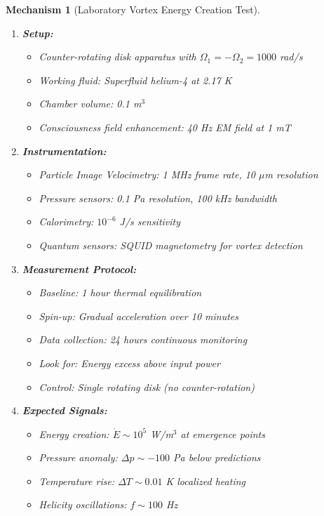 \documentclass[11pt]{article}
\newtheorem{mechanism}[theorem]{Mechanism}
\theoremstyle{definition}
\begin{document}
\begin{mechanism}[Laboratory Vortex Energy Creation Test]
\begin{enumerate}
\item \textbf{Setup:}
   \begin{itemize}
   \item Counter-rotating disk apparatus with $\Omega_1 = -\Omega_2 = 1000$ rad/s
   \item Working fluid: Superfluid helium-4 at 2.17 K
   \item Chamber volume: 0.1 m$^3$
   \item Consciousness field enhancement: 40 Hz EM field at 1 mT
   \end{itemize}

\item \textbf{Instrumentation:}
   \begin{itemize}
   \item Particle Image Velocimetry: 1 MHz frame rate, 10 $\mu$m resolution
   \item Pressure sensors: 0.1 Pa resolution, 100 kHz bandwidth
   \item Calorimetry: $10^{-6}$ J/s sensitivity
   \item Quantum sensors: SQUID magnetometry for vortex detection
   \end{itemize}

\item \textbf{Measurement Protocol:}
   \begin{itemize}
   \item Baseline: 1 hour thermal equilibration
   \item Spin-up: Gradual acceleration over 10 minutes
   \item Data collection: 24 hours continuous monitoring
   \item Look for: Energy excess above input power
   \item Control: Single rotating disk (no counter-rotation)
   \end{itemize}

\item \textbf{Expected Signals:}
   \begin{itemize}
   \item Energy creation: $\dot{E} \sim 10^5$ W/m$^3$ at emergence points
   \item Pressure anomaly: $\Delta p \sim -100$ Pa below predictions
   \item Temperature rise: $\Delta T \sim 0.01$ K localized heating
   \item Helicity oscillations: $f \sim 100$ Hz
   \end{itemize}
\end{enumerate}
\end{mechanism}
\end{document}
